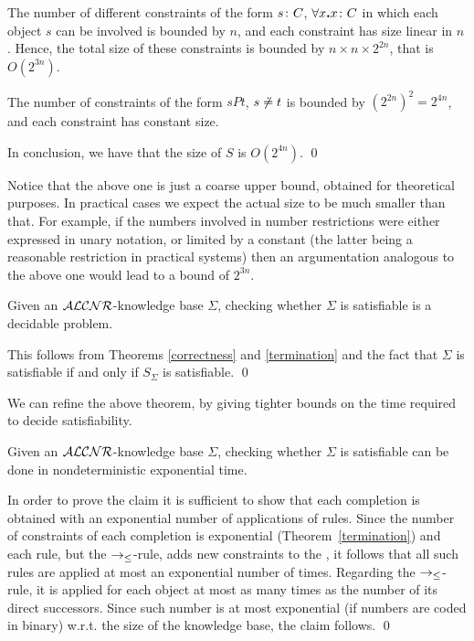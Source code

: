 The number of different constraints of the form $s\colon C$, $\forall x\mbox{\bf .}{x\colon C}$ in
which each object $s$ can be involved is bounded by $n$, and each constraint
has size linear in $n$.
Hence, the total size of these constraints is bounded by
$n\times n\times 2^{2n}$, that is $O(2^{3n})$.

The number of constraints of the form $sPt$, ${s \not\doteq t}$ is bounded by
$(2^{2n})^2 = 2^{4n}$, and each constraint has constant size.

In conclusion, we have that the size of $S$ is $O(2^{4n})$. 
\qed

Notice that the above one is just a coarse upper bound, obtained
for theoretical purposes. In practical cases we expect the actual size to
be much smaller than that. For example, if the numbers involved in number
restrictions were either expressed in unary notation, or limited by a
constant (the latter being a reasonable restriction in practical systems)
then an argumentation analogous to the above one would lead to a bound of
$2^{3n}$.

\begin{theorem}[Decidability]
Given an ${\cal ALCNR}$-knowledge base $\Sigma$, checking whether $\Sigma$ is
satisfiable is a decidable problem.
\end{theorem}
\proof  
This follows from Theorems \ref{correctness} and \ref{termination}
and the fact that $\Sigma$ is satisfiable if and only if
$S_\Sigma$ is satisfiable.
\qed

We can refine the above theorem, by giving tighter bounds on the time
required  to decide satisfiability.

\begin{theorem}
Given an ${\cal ALCNR}$-knowledge base $\Sigma$, checking \linebreak whether $\Sigma$ is
satisfiable can be done in nondeterministic exponential time.
\end{theorem}
\proof  
In order to prove the claim it is sufficient to show that each completion is
obtained with an exponential number of applications of rules. Since the number
of constraints of each completion is exponential (Theorem~\ref{termination}) and
each rule, but the $\rightarrow_\leq$-rule, adds new constraints to the \cs, it follows
that all such rules are applied at most an exponential number of times.
Regarding the  $\rightarrow_\leq$-rule, it is applied for each object at most as many
times as the number of its direct successors. Since such number is at most
exponential (if numbers are coded in binary) w.r.t. the size of the knowledge
base, the claim follows.  
\qed


